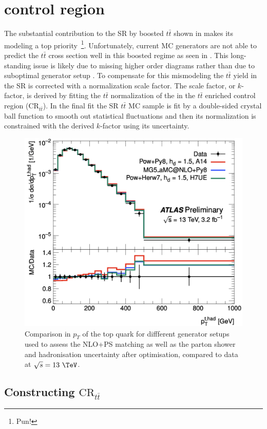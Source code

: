 \section{\ttbar control region} \label{sec:background:ttbar}

The substantial contribution to the SR by boosted $t\bar{t}$ shown in
 makes its modeling a top
priority~\footnote{Pun!}.  Unfortunately, current MC generators are not able to
predict the $t\bar{t}$ cross section well in this boosted regime as seen in
.  This long-standing issue is likely due to
missing higher order diagrams rather than due to suboptimal generator setup
\cite{ATL-PHYS-PUB-2018-009}.  To compensate for this mismodeling the
$t\bar{t}$ yield in the SR is corrected with a normalization scale factor.  The
scale factor, or $k$-factor, is derived by fitting the $t\bar{t}$ normalization
of the in the $t\bar{t}$ enriched control region ($\text{CR}_{t\bar{t}}$).  In
the final fit the SR $t\bar{t}$ MC sample is fit by a double-sided crystal ball
function \cite{Gaiser:1982yw} to smooth out statistical fluctuations and then
its normalization is constrained with the derived $k$-factor using its
uncertainty.

\begin{figure}[!htbp]
\centering
\includegraphics[width=0.6\linewidth]{figures/backgrounds/mismodeling}
\caption{Comparison in $p_{T}$ of the top quark for diffferent generator setups
used to assess the NLO+PS matching as well as the parton shower and
hadronisation uncertainty after optimisation, compared to data at $\sqrt{s} =
13~\TeV$.}
\label{sec:background:mismodeling}
\end{figure}

\subsection{Constructing $\text{CR}_{t\bar{t}}$}


